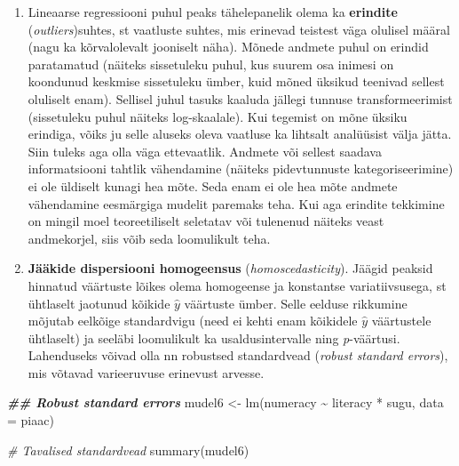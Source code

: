 \documentclass[
]{book}
\newenvironment{Shaded}{\begin{snugshade}}{\end{snugshade}}
\newcommand{\AttributeTok}[1]{\textcolor[rgb]{0.77,0.63,0.00}{#1}}
\newcommand{\CommentTok}[1]{\textcolor[rgb]{0.56,0.35,0.01}{\textit{#1}}}
\newcommand{\DocumentationTok}[1]{\textcolor[rgb]{0.56,0.35,0.01}{\textbf{\textit{#1}}}}
\newcommand{\FunctionTok}[1]{\textcolor[rgb]{0.00,0.00,0.00}{#1}}
\newcommand{\NormalTok}[1]{#1}
\newcommand{\OtherTok}[1]{\textcolor[rgb]{0.56,0.35,0.01}{#1}}
\newcommand{\SpecialCharTok}[1]{\textcolor[rgb]{0.00,0.00,0.00}{#1}}
\begin{document}
\begin{enumerate}
\def\labelenumi{\arabic{enumi}.}
\setcounter{enumi}{1}
\item
  Lineaarse regressiooni puhul peaks tähelepanelik olema ka \textbf{erindite} (\emph{outliers})suhtes, st vaatluste suhtes, mis erinevad teistest väga olulisel määral (nagu ka kõrvalolevalt jooniselt näha). Mõnede andmete puhul on erindid paratamatud (näiteks sissetuleku puhul, kus suurem osa inimesi on koondunud keskmise sissetuleku ümber, kuid mõned üksikud teenivad sellest oluliselt enam). Sellisel juhul tasuks kaaluda jällegi tunnuse transformeerimist (sissetuleku puhul näiteks log-skaalale). Kui tegemist on mõne üksiku erindiga, võiks ju selle aluseks oleva vaatluse ka lihtsalt analüüsist välja jätta. Siin tuleks aga olla väga ettevaatlik. Andmete või sellest saadava informatsiooni tahtlik vähendamine (näiteks pidevtunnuste kategoriseerimine) ei ole üldiselt kunagi hea mõte. Seda enam ei ole hea mõte andmete vähendamine eesmärgiga mudelit paremaks teha. Kui aga erindite tekkimine on mingil moel teoreetiliselt seletatav või tulenenud näiteks veast andmekorjel, siis võib seda loomulikult teha.
\item
  \textbf{Jääkide dispersiooni homogeensus} (\emph{homoscedasticity}). Jäägid peaksid hinnatud väärtuste lõikes olema homogeense ja konstantse variatiivsusega, st ühtlaselt jaotunud kõikide \(\hat{y}\) väärtuste ümber. Selle eelduse rikkumine mõjutab eelkõige standardvigu (need ei kehti enam kõikidele \(\hat{y}\) väärtustele ühtlaselt) ja seeläbi loomulikult ka usaldusintervalle ning \emph{p}-väärtusi. Lahenduseks võivad olla nn robustsed standardvead (\emph{robust standard errors}), mis võtavad varieeruvuse erinevust arvesse.
\end{enumerate}

\begin{Shaded}
\begin{Highlighting}[]
\DocumentationTok{\#\# Robust standard errors}
\NormalTok{mudel6 }\OtherTok{\textless{}{-}} \FunctionTok{lm}\NormalTok{(numeracy }\SpecialCharTok{\textasciitilde{}}\NormalTok{ literacy }\SpecialCharTok{*}\NormalTok{ sugu, }
             \AttributeTok{data =}\NormalTok{ piaac)}

\CommentTok{\# Tavalised standardvead}
\FunctionTok{summary}\NormalTok{(mudel6)}
\end{Highlighting}
\end{Shaded}
\end{document}
